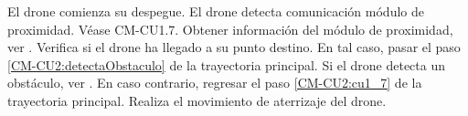 
\begin{UCtrayectoria}
	\UCpaso [\UCactor] El drone comienza su despegue.
	\UCpaso [\UCactor] El drone detecta comunicación módulo de proximidad.
	\UCpaso \label{CM-CU2:cu1_7} Véase CM-CU1.7.
	\UCpaso Obtener información del módulo de proximidad, ver 
		.
	\UCpaso Verifica si el drone ha llegado a su punto destino. En tal caso, 
	pasar el paso \ref{CM-CU2:detectaObstaculo} de la trayectoria principal.
	\UCpaso \label{CM-CU2:detectaObstaculo} Si el drone detecta un 
	obstáculo, ver . En caso contrario, regresar el paso 
	\ref{CM-CU2:cu1_7} de la trayectoria principal.
	\UCpaso Realiza el movimiento de aterrizaje del drone.
\end{UCtrayectoria}










